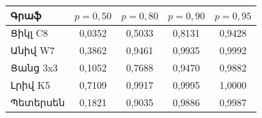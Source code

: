 \begin{tabular}{|l|c|c|c|c|}
\hline
Գրաֆ & $p=0{,}50$ & $p=0{,}80$ & $p=0{,}90$ & $p=0{,}95$\\
\hline
Ցիկլ C8 & 0{,}0352 & 0{,}5033 & 0{,}8131 & 0{,}9428\\
\hline
Անիվ W7 & 0{,}3862 & 0{,}9461 & 0{,}9935 & 0{,}9992\\
\hline
Ցանց 3x3 & 0{,}1052 & 0{,}7688 & 0{,}9470 & 0{,}9882\\
\hline
Լրիվ K5 & 0{,}7109 & 0{,}9917 & 0{,}9995 & 1{,}0000\\
\hline
Պետերսեն & 0{,}1821 & 0{,}9035 & 0{,}9886 & 0{,}9987\\
\hline
\end{tabular}
